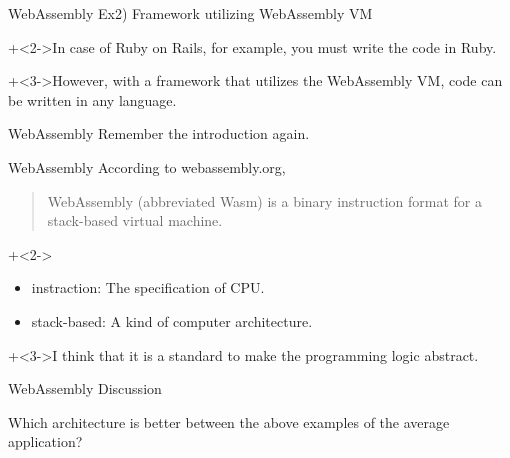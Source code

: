 \begin{frame}{WebAssembly}{}
    Ex2) Framework utilizing WebAssembly VM
    \vspace{4ex}

    \onslide+<2->{In case of Ruby on Rails, for example, you must write the code in Ruby.}
    \vspace{4ex}

    \onslide+<3->{However, with a framework that utilizes the WebAssembly VM, code can be written in any language.}
\end{frame}


\begin{frame}{WebAssembly}{}
    Remember the introduction again.
\end{frame}


\begin{frame}{WebAssembly}{}
    According to webassembly.org,
    \begin{quote}WebAssembly (abbreviated Wasm) is a binary instruction format for a stack-based virtual machine.\end{quote}
    \vspace{2ex}

    \onslide+<2->{
        \begin{itemize}
            \item   instraction:    The specification of CPU.
            \item   stack-based:    A kind of computer architecture.
        \end{itemize}
    }
    \vspace{2ex}

    \onslide+<3->{I think that it is a standard to make the programming logic abstract.}
\end{frame}


\begin{frame}{WebAssembly}{}
    Discussion
    \vspace{4ex}

    Which architecture is better between the above examples of the average application?
\end{frame}
